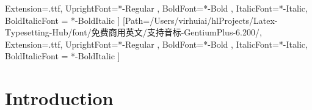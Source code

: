 \documentclass[a4paper,landscape]{book}
\begin{document}
\newcommand\counterSetTmpOpen{\providecommand{\counterSetTmp}{}\renewcommand\counterSetTmp[2]{\setcounter{##1}{##2}}}
\newcommand\counterSetTmpClose{\providecommand{\counterSetTmp}{}\renewcommand\counterSetTmp[2]{}}
\counterSetTmpOpen



Extension=.ttf,
UprightFont=*-Regular ,
BoldFont=*-Bold ,
ItalicFont=*-Italic,
BoldItalicFont = *-BoldItalic
]
\newfontfamily{}[Path=/Users/virhuiai/hlProjects/Latex-Typesetting-Hub/font/免费商用英文/支持音标-GentiumPlus-6.200/,
Extension=.ttf,
UprightFont=*-Regular ,
BoldFont=*-Bold ,
ItalicFont=*-Italic,
BoldItalicFont = *-BoldItalic
]


\newcommand{\csh一音标}[2]{%
\makebox[0pt][l]{\raisebox{0.85em}{ \small\fontGentiumPlus#2}}
}

\newcommand{\csh一音标二}[2]{%
\settowidth{\csh一音标一单词宽度}{#1~}
\makebox[0pt][l]{\raisebox{1em}{\hspace{-\csh一音标一单词宽度}\small\fontGentiumPlus#2}}
}




\chapter{Introduction}
\end{document}
